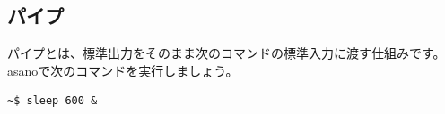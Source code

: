 \documentclass[a4j]{ltjreport}
\begin{document}





    \subsection{パイプ}
    パイプとは、標準出力をそのまま次のコマンドの標準入力に渡す仕組みです。
    asanoで次のコマンドを実行しましょう。
    \begin{lstlisting}[numbers=none]
    ~$ sleep 600 &
    \end{lstlisting}
\end{document}
